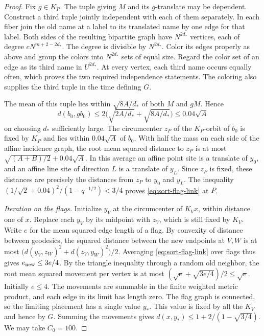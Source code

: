 \begin{proof}
Fix $g\in K_P$. The tuple giving $M$ and its $g$-translate may be
dependent. Construct a third tuple jointly independent with each of
them separately. In each fiber join the old name at a label to its
translated name by one edge for that label. Both sides of the resulting
bipartite graph have $N^{2d_*}$ vertices, each of degree
$cN^{m+2-2d_*}$. The degree is divisible by $N^{2d_*}$. Color its
edges properly as above and group the colors into $N^{2d_*}$ sets of
equal size. Regard the color set of an edge as its third name in
$U^{2d_*}$. At every vertex, each third name occurs equally often,
which proves the two required independence statements. The coloring
also supplies the third tuple in the time defining $G$.

The mean of this tuple lies within $\sqrt{8A/d_*}$ of both $M$ and
$gM$. Hence
\[
 d(b_0,gb_0)\le 2\bigl(\sqrt{2A/d_*}+\sqrt{8A/d_*}\bigr)
                      \le 0.04\sqrt A
\]
on choosing $d_*$ sufficiently large. The circumcenter $z_P$ of the
$K_P$-orbit of $b_0$ is fixed by $K_P$ and lies within $0.04\sqrt A$
of $b_0$. With half the mass on each side of the affine incidence graph,
the root mean squared distance to $z_P$ is at most
$\sqrt{(A+B)/2}+0.04\sqrt A$. In this average an affine point site is a
translate of $y_0$, and an affine line site of direction $L$ is a
translate of $y_L$. Since $z_P$ is fixed, these distances are precisely
the distances from $z_P$ to $y_0$ and $y_L$. The inequality
$(1/\sqrt2+0.04)^2/(1-q^{-1/2})<3/4$ proves
\eqref{eq:sort-flag-link} at $P$.

\smallskip\noindent
\emph{Iteration on the flags.}
Initialize $y_V$ at the circumcenter of $K_Vx$, within distance one of
$x$. Replace each $y_V$ by its midpoint with $z_V$, which is still fixed
by $K_V$. Write $e$ for the mean squared edge length of a flag. By
convexity of distance between geodesics, the squared distance between
the new endpoints at $V,W$ is at most
$\bigl(d(y_V,z_W)^2+d(z_V,y_W)^2\bigr)/2$.
Averaging \eqref{eq:sort-flag-link} over flags thus gives
$e_{\rm new}\le3e/4$. By the triangle inequality through a random old
neighbor, the root mean squared movement per vertex is at most
$(\sqrt e+\sqrt{3e/4})/2\le\sqrt e$.
Initially $e\le4$. The movements are summable in the finite weighted
metric product, and each edge in its limit has length zero. The flag
graph is connected, so the limiting placement has a single value
$y_*$. This value is fixed by all the $K_V$ and hence by $G$.
Summing the movements gives $d(x,y_*)\le1+2/(1-\sqrt{3/4})$.
We may take $C_0=100$.
\end{proof}

